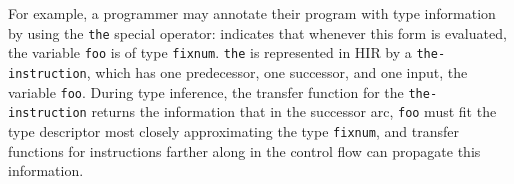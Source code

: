 For example, a \commonlisp{} programmer may annotate their program with type information by using the \texttt{the} special operator:  indicates that whenever this form is evaluated, the variable \texttt{foo} is of type \texttt{fixnum}. \texttt{the} is represented in HIR by a \texttt{the-instruction}, which has one predecessor, one successor, and one input, the variable \texttt{foo}. During type inference, the transfer function for the \texttt{the-instruction} returns the information that in the successor arc, \texttt{foo} must fit the type descriptor most closely approximating the \commonlisp{} type \texttt{fixnum}, and transfer functions for instructions farther along in the control flow can propagate this information.
